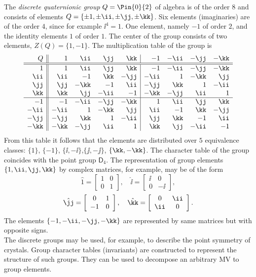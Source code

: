 \begin{example}The \textit{discrete quaternionic group}
$Q=\Pin{0}{2}$ of algebra  is of the order $8$ and
consists of elements $Q=\{\pm 1,\pm\ii,\pm\jj,\pm\kk\}$. Six
elements (imaginaries) are of the order $4$, since for example
$\ii^4=1$. One element, namely $-1$ of order $2$, and the identity
elements $1$ of order $1$. The center of the group consists of two
elements, $Z(Q)=\{1,-1\}$. The multiplication table of the group
is
\[\begin{array}{r||rrrr|rrrr}
Q&1&\ii&\jj&\kk&-1&-\ii&-\jj&-\kk\\ \hline\hline
1&1&\ii&\jj&\kk&-1&-\ii&-\jj&-\kk\\
\ii&\ii&-1&\kk&-\jj&-\ii&1&-\kk&\jj\\
\jj&\jj&-\kk&-1&\ii&-\jj&\kk&1&-\ii\\
\kk&\kk&\jj&-\ii&-1&-\kk&-\jj&\ii&1\\ \hline
-1&-1&-\ii&-\jj&-\kk&1&\ii&\jj&\kk\\
-\ii&-\ii&1&-\kk&\jj&\ii&-1&\kk&-\jj\\
-\jj&-\jj&\kk&1&-\ii&\jj&\kk&-1&\ii\\
-\kk&-\kk&-\jj&\ii&1&\kk&\jj&-\ii&-1\\
\end{array}\]
From this table it follows that the elements are distributed over
$5$ equivalence classes: $\{1\}$,  $\{-1\}$,
$\{\ii,-\ii\}$,$\{\jj,-\jj\}$, $\{\kk,-\kk\}$. The character table
of the group coincides with the point group  $\mathsf{D}_4$. The
representation of group elements $\{1,\ii,\jj,\kk\}$ by complex
matrices, for example, may be of the form
\begin{equation*}
\hat{1}=\left[
\begin{array}{cc}
1 & 0 \\
0 & 1
\end{array}
\right],\quad \hat{\ii}=\left[
\begin{array}{cc}
\ii & 0 \\
0 & -\ii
\end{array}
\right],
\end{equation*}
%
\begin{equation*}
\hat{\jj}=\left[
\begin{array}{cc}
0 & 1 \\
-1 & 0
\end{array}
\right],\quad \hat{\kk}=\left[
\begin{array}{cc}
0 &\ii \\
\ii & 0
\end{array}
\right].
\end{equation*}
The elements $\{-1,-\ii,-\jj,-\kk\}$ are represented by same
matrices but with opposite signs.\\
The discrete groups may be used, for example, to describe  the
point symmetry of crystals. Group character tables (invariants)
are constructed to represent the structure of such groups. They
can be used to decompose an arbitrary MV to group elements.
\end{example}


